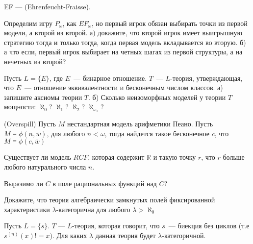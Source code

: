 \setcounter{curtask}{17}


EF --- (Ehrenfeucht-Fraisse).

\begin{task}
    Определим игру $P_{\omega}$, как $EF_{\omega}$, но первый игрок обязан выбирать
    точки из первой модели, а второй из второй.
	а) докажите, что второй игрок имеет выигрышную стратегию тогда и только тогда,
    когда первая модель вкладывается во вторую.
    б) а что если, первый игрок выбирает на четных шагах из первой структуры, а на
    нечетных из второй?
\end{task}

\begin{task}
    Пусть $L = \{E\}$, где $E$~--- бинарное отношение. $T$~--- $L$-теория,
    утверждающая, что $E$~--- отношение эквивалентности и бесконечным числом классов.
    а) запишите аксиомы теории $T$.
    б) Сколько неизоморфных моделей у теории $T$ мощности: $\aleph_0$? $\aleph_1$?
    $\aleph_2$? $\aleph_{\omega_1}$?
\end{task}

\begin{task}(Overspill)
    Пусть $M$ нестандартная модель арифметики Пеано. Пусть
    $M \models \phi(n, \overline{w})$, для любого $n < \omega$, тогда найдется такое
    бесконечное $c$, что $M \models \phi(c, \overline{w})$
\end{task}

\breakline


\begin{ptask}{9}
  	Существует ли модель $RCF$, которая содержит $\mathbb{R}$ и такую точку $r$, что
    $r$ больше любого натурального числа $n$.
\end{ptask}

\begin{ptask}{12}
    Выразимо ли $C$ в поле рациональных функций над $C$?
\end{ptask}

\begin{ptask}{13}
    Докажите, что теория алгебраически замкнутых полей фиксированной характеристики
    $\lambda$-категорична для любого $\lambda > \aleph_0$
\end{ptask}

\begin{ptask}{16}
    Пусть $L = \{s\}$. $T$ --- $L$-теория, которая говорит, что $s$~--- биекция без
	циклов (т.е $s^{(n)}(x) != x$). Для каких $\lambda$ данная теория будет
    $\lambda$-категоричной.
\end{ptask}
